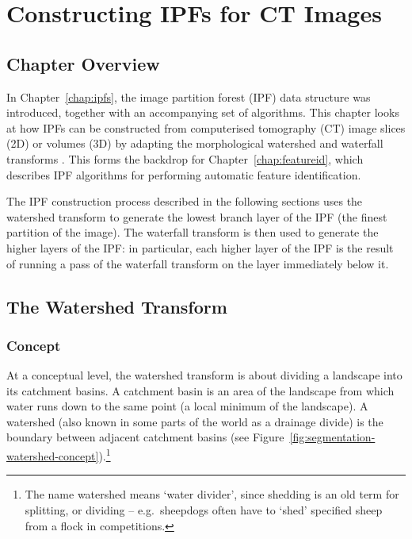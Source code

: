 \chapter{Constructing IPFs for CT Images}
\label{chap:segmentation}

\section{Chapter Overview}

In Chapter~\ref{chap:ipfs}, the image partition forest (IPF) data structure was introduced, together with an accompanying set of algorithms. This chapter looks at how IPFs can be constructed from computerised tomography (CT) image slices (2D) or volumes (3D) by adapting the morphological watershed and waterfall transforms \cite{beucher94,marcotegui05}. This forms the backdrop for Chapter~\ref{chap:featureid}, which describes IPF algorithms for performing automatic feature identification.

The IPF construction process described in the following sections uses the watershed transform to generate the lowest branch layer of the IPF (the finest partition of the image). The waterfall transform is then used to generate the higher layers of the IPF: in particular, each higher layer of the IPF is the result of running a pass of the waterfall transform on the layer immediately below it.

\section{The Watershed Transform}

\subsection{Concept}

At a conceptual level, the watershed transform is about dividing a landscape into its catchment basins. A catchment basin is an area of the landscape from which water runs down to the same point (a local minimum of the landscape). A watershed (also known in some parts of the world as a drainage divide) is the boundary between adjacent catchment basins (see Figure~\ref{fig:segmentation-watershed-concept}).\footnote{The name watershed means `water divider', since shedding is an old term for splitting, or dividing -- e.g.~sheepdogs often have to `shed' specified sheep from a flock in competitions.}


